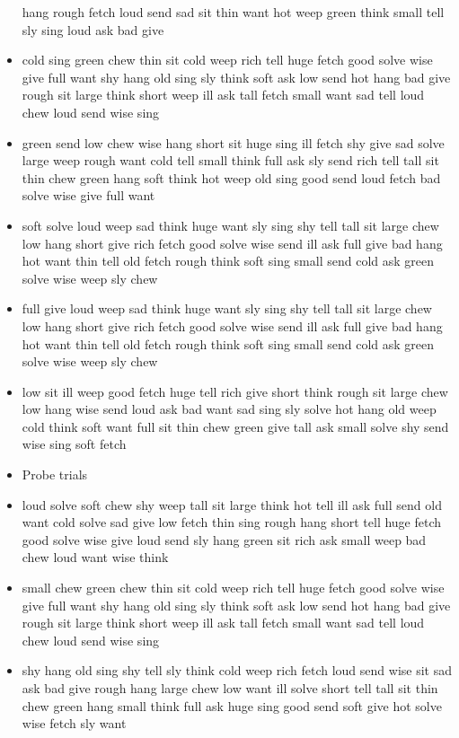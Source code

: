 \documentclass[10pt,letterpaper]{article}
\begin{document}
\begin{flushleft}
\begin{itemize}
hang
rough
fetch
loud
send
sad
sit
thin
want
hot
weep
green
think
small
tell
sly
sing
loud
ask
bad
give
  \item cold
sing
green
chew
thin
sit
cold
weep
rich
tell
huge
fetch
good
solve
wise
give
full
want
shy
hang
old
sing
sly
think
soft
ask
low
send
hot
hang
bad
give
rough
sit
large
think
short
weep
ill
ask
tall
fetch
small
want
sad
tell
loud
chew
loud
send
wise
sing
  \item green
send
low
chew
wise
hang
short
sit
huge
sing
ill
fetch
shy
give
sad
solve
large
weep
rough
want
cold
tell
small
think
full
ask
sly
send
rich
tell
tall
sit
thin
chew
green
hang
soft
think
hot
weep
old
sing
good
send
loud
fetch
bad
solve
wise
give
full
want
  \item soft
solve
loud
weep
sad
think
huge
want
sly
sing
shy
tell
tall
sit
large
chew
low
hang
short
give
rich
fetch
good
solve
wise
send
ill
ask
full
give
bad
hang
hot
want
thin
tell
old
fetch
rough
think
soft
sing
small
send
cold
ask
green
solve
wise
weep
sly
chew
  \item full
give
loud
weep
sad
think
huge
want
sly
sing
shy
tell
tall
sit
large
chew
low
hang
short
give
rich
fetch
good
solve
wise
send
ill
ask
full
give
bad
hang
hot
want
thin
tell
old
fetch
rough
think
soft
sing
small
send
cold
ask
green
solve
wise
weep
sly
chew
  \item low
sit
ill
weep
good
fetch
huge
tell
rich
give
short
think
rough
sit
large
chew
low
hang
wise
send
loud
ask
bad
want
sad
sing
sly
solve
hot
hang
old
weep
cold
think
soft
want
full
sit
thin
chew
green
give
tall
ask
small
solve
shy
send
wise
sing
soft
fetch
  \item Probe trials
  \item loud
solve
soft
chew
shy
weep
tall
sit
large
think
hot
tell
ill
ask
full
send
old
want
cold
solve
sad
give
low
fetch
thin
sing
rough
hang
short
tell
huge
fetch
good
solve
wise
give
loud
send
sly
hang
green
sit
rich
ask
small
weep
bad
chew
loud
want
wise
think

  \item small
chew
green
chew
thin
sit
cold
weep
rich
tell
huge
fetch
good
solve
wise
give
full
want
shy
hang
old
sing
sly
think
soft
ask
low
send
hot
hang
bad
give
rough
sit
large
think
short
weep
ill
ask
tall
fetch
small
want
sad
tell
loud
chew
loud
send
wise
sing
  \item shy
hang
old
sing
shy
tell
sly
think
cold
weep
rich
fetch
loud
send
wise
sit
sad
ask
bad
give
rough
hang
large
chew
low
want
ill
solve
short
tell
tall
sit
thin
chew
green
hang
small
think
full
ask
huge
sing
good
send
soft
give
hot
solve
wise
fetch
sly
want


\end{itemize}
\end{flushleft}
\end{document}
